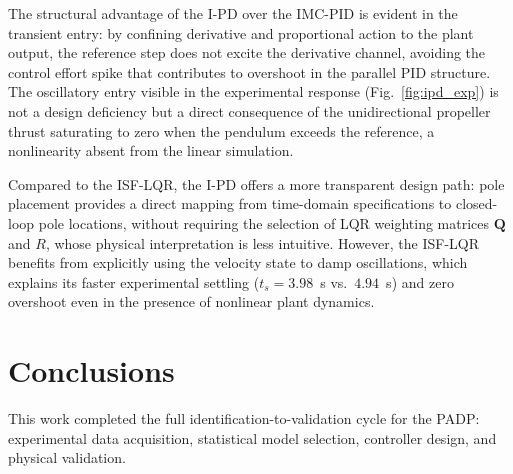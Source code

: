 \documentclass[conference]{IEEEtran}
\begin{document}
The structural advantage of the I-PD over the IMC-PID is evident in the transient entry: by
confining derivative and proportional action to the plant output, the reference step does not excite the
derivative channel, avoiding the control effort spike that contributes to overshoot in the parallel PID structure. The oscillatory entry visible in the experimental response (Fig.~\ref{fig:ipd_exp}) is not a design deficiency but a direct consequence of the unidirectional propeller thrust saturating to zero when the pendulum exceeds the reference, a nonlinearity absent from the linear simulation. 

Compared to the ISF-LQR, the I-PD offers a more transparent design path: pole placement provides a direct mapping from time-domain specifications to closed-loop pole locations, without requiring the selection of LQR weighting matrices $\mathbf{Q}$ and $R$, whose physical interpretation is less intuitive. However, the ISF-LQR benefits from explicitly using the velocity state to damp
oscillations, which explains its faster experimental settling ($t_s = 3.98$~s vs.\ $4.94$~s) and zero overshoot even in the presence of nonlinear plant dynamics.




\section{Conclusions}
This work completed the full identification-to-validation cycle for the PADP: experimental data acquisition, statistical model selection, controller design, and physical validation.
\end{document}
